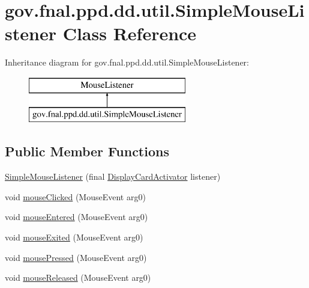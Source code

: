 \hypertarget{classgov_1_1fnal_1_1ppd_1_1dd_1_1util_1_1SimpleMouseListener}{\section{gov.\-fnal.\-ppd.\-dd.\-util.\-Simple\-Mouse\-Listener Class Reference}
\label{classgov_1_1fnal_1_1ppd_1_1dd_1_1util_1_1SimpleMouseListener}
}
Inheritance diagram for gov.\-fnal.\-ppd.\-dd.\-util.\-Simple\-Mouse\-Listener\-:\begin{figure}[H]
\begin{center}
\leavevmode
\includegraphics[height=2.000000cm]{classgov_1_1fnal_1_1ppd_1_1dd_1_1util_1_1SimpleMouseListener}
\end{center}
\end{figure}
\subsection*{Public Member Functions}
\begin{DoxyCompactItemize}
\item 
\hyperlink{classgov_1_1fnal_1_1ppd_1_1dd_1_1util_1_1SimpleMouseListener_a56edbdbbfeeea46b9f6744e6904c65c6}{Simple\-Mouse\-Listener} (final \hyperlink{interfacegov_1_1fnal_1_1ppd_1_1dd_1_1util_1_1DisplayCardActivator}{Display\-Card\-Activator} listener)
\item 
void \hyperlink{classgov_1_1fnal_1_1ppd_1_1dd_1_1util_1_1SimpleMouseListener_afacf2e7d67af79f20043835ac3df6126}{mouse\-Clicked} (Mouse\-Event arg0)
\item 
void \hyperlink{classgov_1_1fnal_1_1ppd_1_1dd_1_1util_1_1SimpleMouseListener_a72114b6e103fff75a6ea3d9d7967781d}{mouse\-Entered} (Mouse\-Event arg0)
\item 
void \hyperlink{classgov_1_1fnal_1_1ppd_1_1dd_1_1util_1_1SimpleMouseListener_ac69d1a1b6f1e2e85d4ebbe09eb064d2f}{mouse\-Exited} (Mouse\-Event arg0)
\item 
void \hyperlink{classgov_1_1fnal_1_1ppd_1_1dd_1_1util_1_1SimpleMouseListener_af08f386c74fdd5b2432e1a35e285c205}{mouse\-Pressed} (Mouse\-Event arg0)
\item 
void \hyperlink{classgov_1_1fnal_1_1ppd_1_1dd_1_1util_1_1SimpleMouseListener_ab6b202febb74072723c93fa830d0e51e}{mouse\-Released} (Mouse\-Event arg0)
\end{DoxyCompactItemize}


